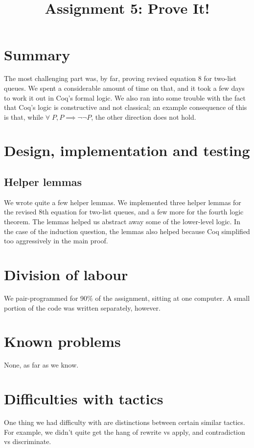 

\title{Assignment 5: Prove It!}
\author{\name}
\maketitle

\section{Summary}
The most challenging part was, by far, proving revised equation 8 for two-list queues. We spent a considerable amount of time on that, and it took a few days to work it out in Coq's formal logic. We also ran into some trouble with the fact that Coq's logic is constructive and not classical; an example consequence of this is that, while $\forall\; P, P \implies \neg\neg P$, the other direction does not hold.

\section{Design, implementation and testing}

\subsection{Helper lemmas}
We wrote quite a few helper lemmas. We implemented three helper lemmas for the revised 8th equation for two-list queues, and a few more for the fourth logic theorem. The lemmas helped us abstract away some of the lower-level logic. In the case of the induction question, the lemmas also helped because Coq simplified too aggressively in the main proof.

\section{Division of labour}
We pair-programmed for 90\% of the assignment, sitting at one computer. A small portion of the code was written separately, however.

\section{Known problems}
None, as far as we know.

\section{Difficulties with tactics}
One thing we had difficulty with are distinctions between certain similar tactics. For example, we didn't quite get the hang of rewrite vs apply, and contradiction vs discriminate.

